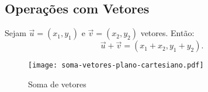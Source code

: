 \subsection{Opera\c{c}\~oes com Vetores} %
\label{sub:operacoes_com_vetores}

\begin{definicao}
  Sejam $\vec{u} = (x_1, y_1)$ e $\vec{v} = (x_2, y_2)$ vetores. Ent\~ao:
  \[
  	\vec{u} + \vec{v} = (x_1 + x_2, y_1 + y_2).
  \]
\end{definicao}

\begin{figure}[!h]
  \centering
  \caption{Soma de vetores}
  \texttt{[image: soma-vetores-plano-cartesiano.pdf]}


\end{figure}

